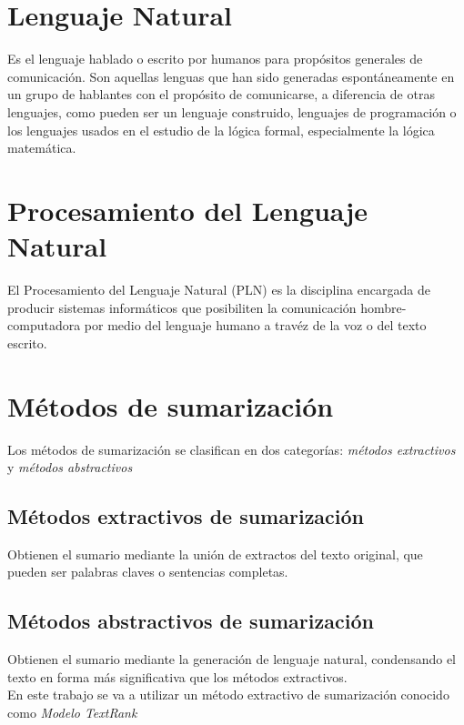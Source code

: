 \section{Lenguaje Natural}
Es el lenguaje hablado o escrito por humanos para prop\'ositos generales
de comunicaci\'on. Son aquellas lenguas que han sido generadas
espont\'aneamente en un grupo de hablantes con el prop\'osito de
comunicarse, a diferencia de otras lenguajes, como pueden ser un lenguaje
construido, lenguajes de programaci\'on o los lenguajes usados en el
estudio de la l\'ogica formal, especialmente la l\'ogica matem\'atica.

\section{Procesamiento del Lenguaje Natural}
El Procesamiento del Lenguaje Natural (PLN) es la disciplina encargada
de producir sistemas inform\'aticos que posibiliten la comunicaci\'on
hombre-computadora por medio del lenguaje humano a trav\'ez de la voz o
del texto escrito.

\section{M\'etodos de sumarizaci\'on}
Los m\'etodos de sumarizaci\'on se clasifican en dos categor\'ias:
\emph{m\'etodos extractivos} y \emph{m\'etodos abstractivos}

\subsection{M\'etodos extractivos de sumarizaci\'on}
Obtienen el sumario mediante la uni\'on de extractos del texto original,
que pueden ser palabras claves o sentencias completas.

\subsection{M\'etodos abstractivos de sumarizaci\'on}
Obtienen el sumario mediante la generaci\'on de lenguaje natural, condensando
el texto en forma m\'as significativa que los m\'etodos extractivos.\\

En este trabajo se va a utilizar un m\'etodo extractivo de sumarizaci\'on conocido
como \emph{Modelo TextRank}


